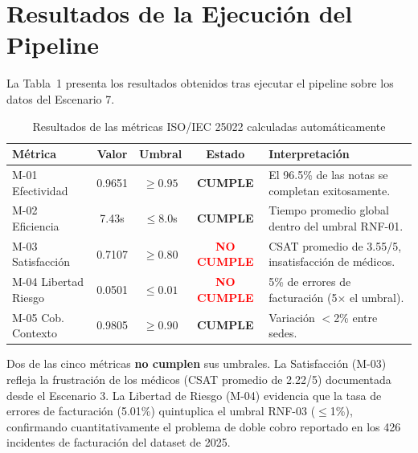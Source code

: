 \documentclass[12pt,a4paper]{article}
\begin{document}
\section{Resultados de la Ejecuci\'on del Pipeline}

La Tabla~1 presenta los resultados obtenidos tras ejecutar el pipeline sobre los datos del Escenario 7.

\begin{table}[H]
\centering
\caption{Resultados de las m\'etricas ISO/IEC 25022 calculadas autom\'aticamente}
\begin{tabularx}{\textwidth}{l c c c l}
\toprule
\textbf{M\'etrica} & \textbf{Valor} & \textbf{Umbral} & \textbf{Estado} & \textbf{Interpretaci\'on} \\
\midrule
M-01 Efectividad & 0.9651 & $\ge 0.95$ & \textcolor{green!60!black}{\textbf{CUMPLE}} & El 96.5\% de las notas se completan exitosamente. \\
M-02 Eficiencia & 7.43s & $\le 8.0$s & \textcolor{green!60!black}{\textbf{CUMPLE}} & Tiempo promedio global dentro del umbral RNF-01. \\
M-03 Satisfacci\'on & 0.7107 & $\ge 0.80$ & \textcolor{red}{\textbf{NO CUMPLE}} & CSAT promedio de 3.55/5, insatisfacci\'on de m\'edicos. \\
M-04 Libertad Riesgo & 0.0501 & $\le 0.01$ & \textcolor{red}{\textbf{NO CUMPLE}} & 5\% de errores de facturaci\'on (5$\times$ el umbral). \\
M-05 Cob. Contexto & 0.9805 & $\ge 0.90$ & \textcolor{green!60!black}{\textbf{CUMPLE}} & Variaci\'on $<$2\% entre sedes. \\
\bottomrule
\end{tabularx}
\end{table}

\begin{tcolorbox}[colback=red!5, colframe=red!50!black, title=Hallazgo cr\'itico]
Dos de las cinco m\'etricas \textbf{no cumplen} sus umbrales. La Satisfacci\'on (M-03) refleja la frustraci\'on de los m\'edicos (CSAT promedio de 2.22/5) documentada desde el Escenario 3. La Libertad de Riesgo (M-04) evidencia que la tasa de errores de facturaci\'on (5.01\%) quintuplica el umbral RNF-03 ($\le$1\%), confirmando cuantitativamente el problema de doble cobro reportado en los 426 incidentes de facturaci\'on del dataset de 2025.
\end{tcolorbox}

\end{document}
